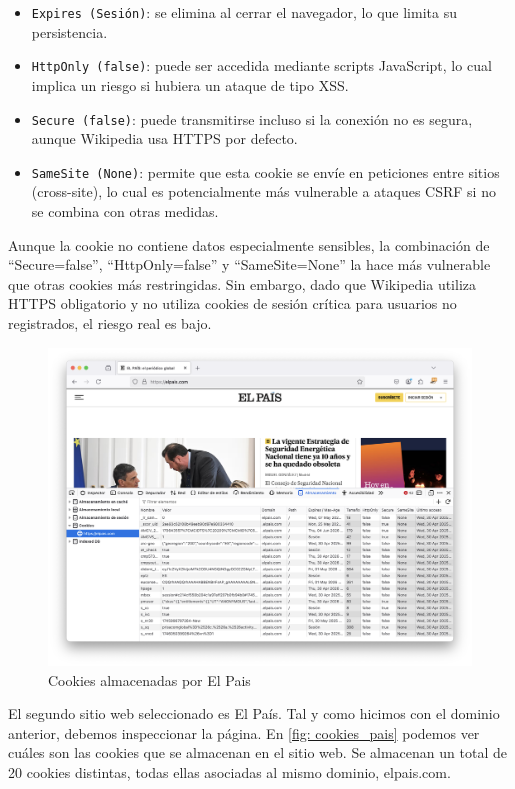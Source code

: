 \begin{itemize}
    \item \texttt{Expires (Sesión)}: se elimina al cerrar el navegador, lo que limita su persistencia.
    \item \texttt{HttpOnly (false)}: puede ser accedida mediante scripts JavaScript, lo cual implica un riesgo si hubiera un ataque de tipo XSS.  
    \item \texttt{Secure (false)}: puede transmitirse incluso si la conexión no es segura, aunque Wikipedia usa HTTPS por defecto.
    \item \texttt{SameSite (None)}: permite que esta cookie se envíe en peticiones entre sitios (cross-site), lo cual es potencialmente más vulnerable a ataques CSRF si no se combina con otras medidas.
\end{itemize}

Aunque la cookie no contiene datos especialmente sensibles, la combinación de “Secure=false”, “HttpOnly=false” y “SameSite=None” la hace más vulnerable que otras cookies más restringidas. Sin embargo, dado que Wikipedia utiliza HTTPS obligatorio y no utiliza cookies de sesión crítica para usuarios no registrados, el riesgo real es bajo. 

\begin{figure}[H]   
    \includegraphics[width=15cm]{cookies_pais.png}
    \caption{Cookies almacenadas por El Pais}
    \label{fig:cookies_pais}
\end{figure}

El segundo sitio web seleccionado es El País. Tal y como hicimos con el dominio anterior, debemos inspeccionar la página. En \ref{fig: cookies_pais} podemos ver cuáles son las cookies que se almacenan en el sitio web. Se almacenan un total de 20 cookies distintas, todas ellas asociadas al mismo dominio, elpais.com.  


